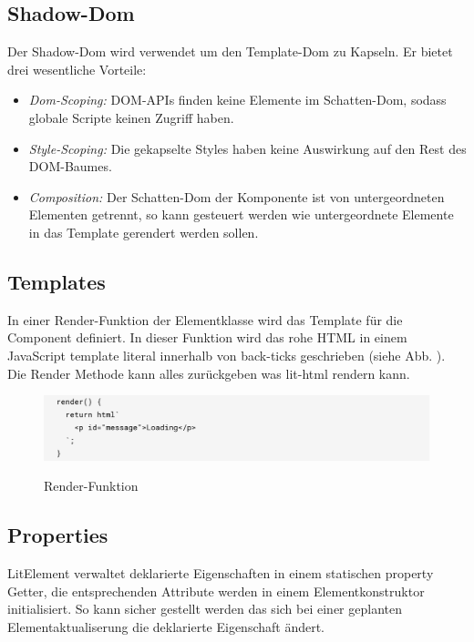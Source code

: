 \documentclass[12pt,					%
							 oneside,			%
							 a4paper,			%
							 halfparskip,		%
							 liststotoc,			%
							 bibtotoc,			%
							 fleqn,				%
							 pointlessnumbers]	%
							 {scrreprt}
\begin{document}
					\subsection{Shadow-Dom}
					Der Shadow-Dom wird verwendet um den Template-Dom zu Kapseln. Er bietet drei wesentliche Vorteile: 
					\begin{itemize}
						\item \textit{Dom-Scoping:} DOM-APIs finden keine Elemente im Schatten-Dom, sodass globale Scripte keinen Zugriff haben.
						\item \textit{Style-Scoping:} Die gekapselte Styles haben keine Auswirkung auf den Rest des DOM-Baumes.
						\item \textit{Composition:} Der Schatten-Dom der Komponente ist von untergeordneten Elementen getrennt, so kann gesteuert werden wie untergeordnete Elemente in das Template gerendert werden sollen.\cite{webcom}
					\end{itemize}
					\subsection{Templates}
					In einer Render-Funktion der Elementklasse wird das Template für die Component definiert. In dieser Funktion wird das rohe HTML in einem JavaScript template literal innerhalb von back-ticks geschrieben (siehe Abb. ). Die Render Methode kann alles zurückgeben was lit-html rendern kann. \cite{litelem}
					\begin{figure}[h]
						\centering
						\includegraphics[width=1\textwidth]{pictures/render-function}
						\caption{Render-Funktion}\cite{litelem}
						\label{Render-Funktion}
					\end{figure}
				
					\subsection{Properties}
					LitElement verwaltet deklarierte Eigenschaften in einem statischen property Getter, die entsprechenden Attribute werden in einem Elementkonstruktor initialisiert. So kann sicher gestellt werden das sich bei einer geplanten Elementaktualiserung die deklarierte Eigenschaft ändert.  \cite{litelem}
		
\end{document}

